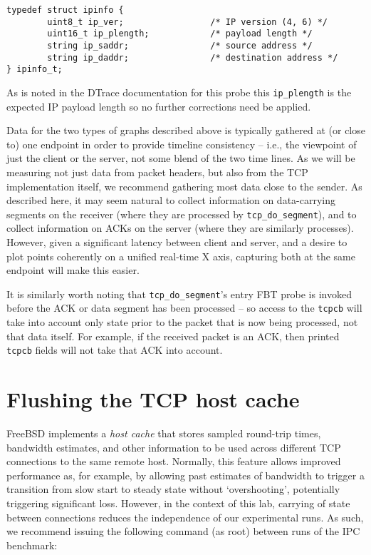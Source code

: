 \documentclass[a4paper,10pt]{article}
\begin{document}
\begin{verbatim}
typedef struct ipinfo {
        uint8_t ip_ver;                 /* IP version (4, 6) */
        uint16_t ip_plength;            /* payload length */
        string ip_saddr;                /* source address */
        string ip_daddr;                /* destination address */
} ipinfo_t;
\end{verbatim}

As is noted in the DTrace documentation for this probe this
\texttt{ip\_plength} is the expected IP payload length so no further
corrections need be applied.

Data for the two types of graphs described above is typically gathered at (or
close to) one endpoint in order to provide timeline consistency -- i.e., the
viewpoint of just the client or the server, not some blend of the two
time lines.
As we will be measuring not just data from packet headers, but also from the
TCP implementation itself, we recommend gathering most data close to the
sender.
As described here, it may seem natural to collect information on data-carrying
segments on the receiver (where they are processed by
\texttt{tcp\_do\_segment}), and to collect information on ACKs on the server
(where they are similarly processes).
However, given a significant latency between client and server, and a desire
to plot points coherently on a unified real-time X axis, capturing both at the
same endpoint will make this easier.

It is similarly worth noting that \texttt{tcp\_do\_segment}'s entry FBT probe
is invoked before the ACK or data segment has been processed -- so access to
the \texttt{tcpcb} will take into account only state prior to the packet that
is now being processed, not that data itself.
For example, if the received packet is an ACK, then printed \texttt{tcpcb}
fields will not take that ACK into account.

\section*{Flushing the TCP host cache}

FreeBSD implements a \textit{host cache} that stores sampled round-trip times,
bandwidth estimates, and other information to be used across different TCP
connections to the same remote host.
Normally, this feature allows improved performance as, for example, by
allowing past estimates of bandwidth to trigger a transition from slow start
to steady state without `overshooting', potentially triggering significant
loss.
However, in the context of this lab, carrying of state between connections
reduces the independence of our experimental runs.
As such, we recommend issuing the following command (as root) between runs of
the IPC benchmark:
\end{document}
